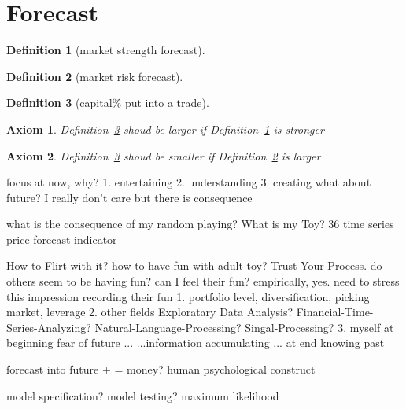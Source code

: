 \documentclass{article}
\newtheorem{definition}{Definition}[section]
\newtheorem{axiom}{Axiom}[section]
\begin{document}
\section{Forecast}
\begin{definition}[market strength forecast]
    \label{msf}
\end{definition}
\begin{definition}[market risk forecast]
    \label{mrf}
\end{definition}
\begin{definition}[capital\% put into a trade]
    \label{cpit}
\end{definition}
\begin{axiom}
    Definition~\ref{cpit} shoud be larger if Definition~\ref{msf} is stronger
\end{axiom}
\begin{axiom}
    Definition~\ref{cpit} shoud be smaller if Definition~\ref{mrf} is larger
\end{axiom}


focus at now, why?
1. entertaining
2. understanding
3. creating
what about future? I really don't care
but there is consequence

what is the consequence of my random playing?
What is my Toy?
    36 time series
        price
        forecast
        indicator

 How to Flirt with it? how to have fun with adult toy? Trust Your Process.
    do others seem to be having fun? can I feel their fun? empirically, yes.
        need to stress this impression
        recording their fun
        1. portfolio level, diversification, picking market, leverage
        2. other fields
            Exploratary Data Analysis?
            Financial-Time-Series-Analyzing?
            Natural-Language-Processing?
            Singal-Processing?
        3. myself
            at beginning fear of future
            ...
            ...information accumulating
            ...
            at end knowing past

forecast into future +  = money?
human psychological construct

model specification?
model testing? maximum likelihood
\end{document}
